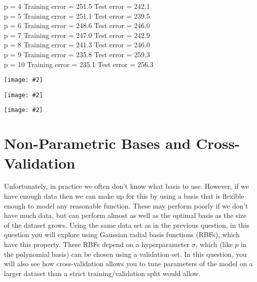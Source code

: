 \documentclass{article}
\newcommand{\centerfig}[2]{\begin{center}\texttt{[image: \#2]}\end{center}}
\begin{document}
p = 4
\newline Training error = 251.5
\newline Test error     = 242.1 \\ 

p = 5
\newline Training error = 251.1
\newline Test error     = 239.5 \\ 

p = 6
\newline Training error = 248.6
\newline Test error     = 246.0 \\ 

p = 7
\newline Training error = 247.0
\newline Test error     = 242.9 \\ 

p = 8
\newline Training error = 241.3
\newline Test error     = 246.0 \\ 

p = 9
\newline Training error = 235.8
\newline Test error     = 259.3 \\ 

p = 10
\newline Training error = 235.1
\newline Test error     = 256.3 \\ 

\centerfig{.7}{../figs/PolyBasis1.pdf}
\centerfig{.7}{../figs/PolyBasis7.pdf}
\centerfig{.7}{../figs/PolyBasis10.pdf}

\section{Non-Parametric Bases and Cross-Validation}

Unfortunately, in practice we often don't know what basis to use.
However, if we have enough data then we can make up for this by using a basis that is flexible enough to
model any reasonable function. These may perform poorly if we don't have much data, but can
 perform almost as well as the optimal basis as the size of the dataset grows.
Using the same data set as in the previous question, 
in this question you will explore using Gaussian radial basis functions (RBFs),
 which have this property. These RBFs depend on a hyperparameter $\sigma$, which
 (like $p$ in the polynomial basis) can be chosen using a validation set.
 In this question, you will also see how cross-validation allows you to tune
 parameters of the model on a larger dataset than a strict training/validation split would allow.
\end{document}
